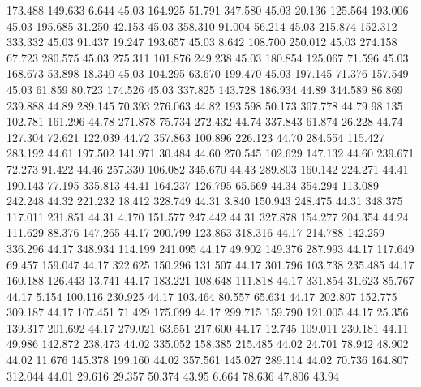  173.488  149.633    6.644        45.03
 164.925   51.791  347.580        45.03
  20.136  125.564  193.006        45.03
 195.685   31.250   42.153        45.03
 358.310   91.004   56.214        45.03
 215.874  152.312  333.332        45.03
  91.437   19.247  193.657        45.03
   8.642  108.700  250.012        45.03
 274.158   67.723  280.575        45.03
 275.311  101.876  249.238        45.03
 180.854  125.067   71.596        45.03
 168.673   53.898   18.340        45.03
 104.295   63.670  199.470        45.03
 197.145   71.376  157.549        45.03
  61.859   80.723  174.526        45.03
 337.825  143.728  186.934        44.89
 344.589   86.869  239.888        44.89
 289.145   70.393  276.063        44.82
 193.598   50.173  307.778        44.79
  98.135  102.781  161.296        44.78
 271.878   75.734  272.432        44.74
 337.843   61.874   26.228        44.74
 127.304   72.621  122.039        44.72
 357.863  100.896  226.123        44.70
 284.554  115.427  283.192        44.61
 197.502  141.971   30.484        44.60
 270.545  102.629  147.132        44.60
 239.671   72.273   91.422        44.46
 257.330  106.082  345.670        44.43
 289.803  160.142  224.271        44.41
 190.143   77.195  335.813        44.41
 164.237  126.795   65.669        44.34
 354.294  113.089  242.248        44.32
 221.232   18.412  328.749        44.31
   3.840  150.943  248.475        44.31
 348.375  117.011  231.851        44.31
   4.170  151.577  247.442        44.31
 327.878  154.277  204.354        44.24
 111.629   88.376  147.265        44.17
 200.799  123.863  318.316        44.17
 214.788  142.259  336.296        44.17
 348.934  114.199  241.095        44.17
  49.902  149.376  287.993        44.17
 117.649   69.457  159.047        44.17
 322.625  150.296  131.507        44.17
 301.796  103.738  235.485        44.17
 160.188  126.443   13.741        44.17
 183.221  108.648  111.818        44.17
 331.854   31.623   85.767        44.17
   5.154  100.116  230.925        44.17
 103.464   80.557   65.634        44.17
 202.807  152.775  309.187        44.17
 107.451   71.429  175.099        44.17
 299.715  159.790  121.005        44.17
  25.356  139.317  201.692        44.17
 279.021   63.551  217.600        44.17
  12.745  109.011  230.181        44.11
  49.986  142.872  238.473        44.02
 335.052  158.385  215.485        44.02
  24.701   78.942   48.902        44.02
  11.676  145.378  199.160        44.02
 357.561  145.027  289.114        44.02
  70.736  164.807  312.044        44.01
  29.616   29.357   50.374        43.95
   6.664   78.636   47.806        43.94
